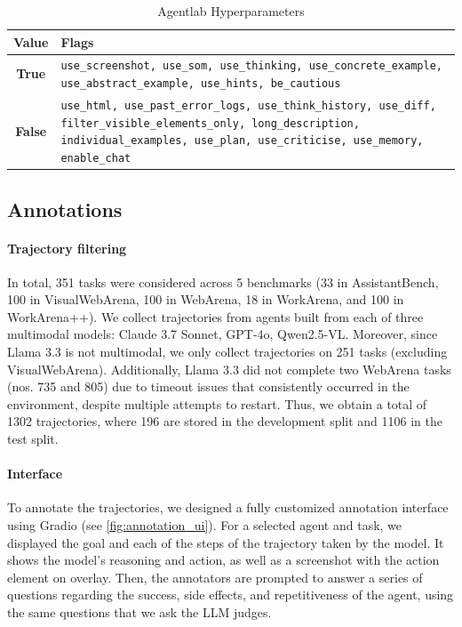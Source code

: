\documentclass{article} %
\begin{document}
\begin{table}[ht!]
    \centering
    \small
    \begin{tabular}{c p{}}
        \toprule
        \textbf{Value} & \textbf{Flags} \\ 
        \midrule
        \textbf{True} & \parbox[t]{0.8\textwidth}{\raggedright \texttt{use\_screenshot, use\_som, use\_thinking, use\_concrete\_example, use\_abstract\_example, use\_hints, be\_cautious}} \\ 
        \midrule
        \textbf{False} & \parbox[t]{0.8\textwidth}{\raggedright \texttt{use\_html, use\_past\_error\_logs, use\_think\_history, use\_diff, filter\_visible\_elements\_only, long\_description, individual\_examples, use\_plan, use\_criticise, use\_memory, enable\_chat}} \\ 
        \bottomrule
    \end{tabular}
    \caption{Agentlab Hyperparameters}
    \label{tab:agentlab_hyperparameters}
\end{table}




\subsection{Annotations}
\label{sec:appendix_annotations}

\paragraph{Trajectory filtering}
In total, 351 tasks were considered across 5 benchmarks (33 in AssistantBench, 100 in VisualWebArena, 100 in WebArena, 18 in WorkArena, and 100 in WorkArena++). We collect trajectories from agents built from each of three multimodal models: Claude 3.7 Sonnet, GPT-4o, Qwen2.5-VL. Moreover, since Llama 3.3 is not multimodal, we only collect trajectories on 251 tasks (excluding VisualWebArena). Additionally, Llama 3.3 did not complete two WebArena tasks (nos. 735 and 805) due to timeout issues that consistently occurred in the environment, despite multiple attempts to restart. Thus, we obtain a total of 1302 trajectories, where 196 are stored in the development split and 1106 in the test split.

\paragraph{Interface}
To annotate the trajectories, we designed a fully customized annotation interface using Gradio (see \cref{fig:annotation_ui}). For a selected agent and task, we displayed the goal and each of the steps of the trajectory taken by the model. It shows the model's reasoning and action, as well as a screenshot with the action element on overlay. Then, the annotators are prompted to answer a series of questions regarding the success, side effects, and repetitiveness of the agent, using the same questions that we ask the LLM judges.
\end{document}
